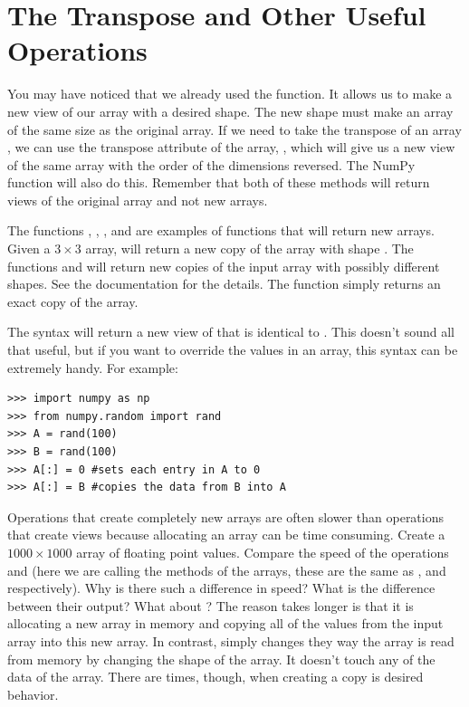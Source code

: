 \section*{The Transpose and Other Useful Operations}
You may have noticed that we already used the  function.
It allows us to make a new view of our array with a desired shape.
The new shape must make an array of the same size as the original array.
If we need to take the transpose of an array , we can use the transpose attribute 
of the array, , which will give us a new view of the same array with the order 
of the dimensions reversed.
The NumPy  function will also do this.
Remember that both of these methods will return views of the original array and not new 
arrays.

The functions , , , and  are examples of 
functions that will return new arrays.
Given a $3 \times 3$ array,  will return a new copy of the array with 
shape . The functions  and  will return new copies of the 
input array with possibly different shapes. See the documentation for the details. The 
function  simply returns an exact copy of the array. 

The syntax  will return a new view of  that is identical to .
This doesn't sound all that useful, but if you want to override the values in an array, 
this syntax can be extremely handy.
For example:
\begin{lstlisting}
>>> import numpy as np
>>> from numpy.random import rand
>>> A = rand(100)
>>> B = rand(100)
>>> A[:] = 0 #sets each entry in A to 0
>>> A[:] = B #copies the data from B into A
\end{lstlisting}

\begin{problem}
Operations that create completely new arrays are often slower than operations that create views because allocating an array can be time consuming.
Create a $1000 \times 1000$ array  of floating point values.
Compare the speed of the operations  and  (here we are calling the methods of the arrays, these are the same as , and  respectively).
Why is there such a difference in speed?
What is the difference between their output?
What about ?
The reason  takes longer is that it is allocating a new array in memory and copying all of the values from the input array into this new array.  In contrast,  simply changes they way the array is read from memory by changing the shape of the array.  It doesn't touch any of the data of the array.  There are times, though, when creating a copy is desired behavior.
\end{problem}

